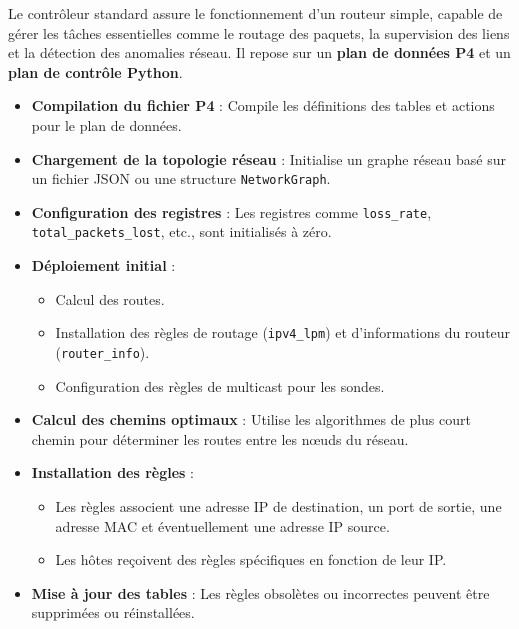 \documentclass[12pt,a4paper]{report}
\begin{document}
        Le contrôleur standard assure le fonctionnement d'un routeur simple, capable de gérer les tâches essentielles comme le routage des paquets, la supervision des liens et la détection des anomalies réseau. 
        Il repose sur un \textbf{plan de données P4} et un \textbf{plan de contrôle Python}.

        \begin{card}[1. Initialisation]
        \begin{itemize}
            \item \textbf{Compilation du fichier P4} : Compile les définitions des tables et actions pour le plan de données.
            \item \textbf{Chargement de la topologie réseau} : Initialise un graphe réseau basé sur un fichier JSON ou une structure \texttt{NetworkGraph}.
            \item \textbf{Configuration des registres} : Les registres comme \texttt{loss\_rate}, \texttt{total\_packets\_lost}, etc., sont initialisés à zéro.
            \item \textbf{Déploiement initial} :
            \begin{itemize}
                \item Calcul des routes.
                \item Installation des règles de routage (\texttt{ipv4\_lpm}) et d'informations du routeur (\texttt{router\_info}).
                \item Configuration des règles de multicast pour les sondes.
            \end{itemize}
        \end{itemize}
        \end{card}

        \begin{card}[2. Routage]
        \begin{itemize}
            \item \textbf{Calcul des chemins optimaux} : Utilise les algorithmes de plus court chemin pour déterminer les routes entre les nœuds du réseau.
            \item \textbf{Installation des règles} :
            \begin{itemize}
                \item Les règles associent une adresse IP de destination, un port de sortie, une adresse MAC et éventuellement une adresse IP source.
                \item Les hôtes reçoivent des règles spécifiques en fonction de leur IP.
            \end{itemize}
            \item \textbf{Mise à jour des tables} : Les règles obsolètes ou incorrectes peuvent être supprimées ou réinstallées.
        \end{itemize}
        \end{card}
\end{document}
